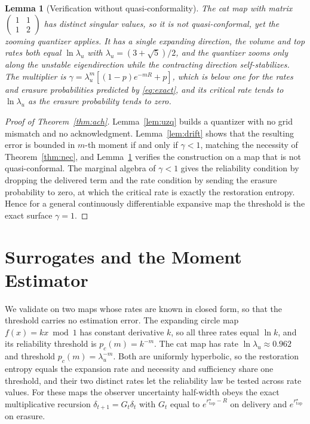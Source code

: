 \documentclass[journal]{IEEEtran}
\newtheorem{lemma}{Lemma}
\theoremstyle{definition}
\theoremstyle{remark}
\newcommand{\rtop}{r^\star_{\mathrm{top}}}
\begin{document}
\begin{lemma}[Verification without quasi-conformality]\label{lem:cat}
The cat map with matrix $\left(\begin{smallmatrix}1&1\\1&2\end{smallmatrix}\right)$ has distinct singular values,
so it is not quasi-conformal, yet the zooming quantizer applies. It has a single expanding direction, the volume
and top rates both equal $\ln\lambda_u$ with $\lambda_u=(3+\sqrt5)/2$, and the quantizer zooms only along the
unstable eigendirection while the contracting direction self-stabilizes. The multiplier is
$\gamma=\lambda_u^{m}[(1-p)e^{-mR}+p]$, which is below one for the rates and erasure probabilities predicted by
\eqref{eq:exact}, and its critical rate tends to $\ln\lambda_u$ as the erasure probability tends to zero.
\end{lemma}

\begin{proof}[Proof of Theorem~\ref{thm:ach}]
Lemma~\ref{lem:uzq} builds a quantizer with no grid mismatch and no acknowledgment. Lemma~\ref{lem:drift} shows
that the resulting error is bounded in $m$-th moment if and only if $\gamma<1$, matching the necessity of
Theorem~\ref{thm:nec}, and Lemma~\ref{lem:cat} verifies the construction on a map that is not quasi-conformal.
The marginal algebra of $\gamma<1$ gives the reliability condition by dropping the delivered term and the rate
condition by sending the erasure probability to zero, at which the critical rate is exactly the restoration
entropy. Hence for a general continuously differentiable expansive map the threshold is the exact surface
$\gamma=1$.
\end{proof}

\section{Surrogates and the Moment Estimator}\label{sec:surr}
We validate on two maps whose rates are known in closed form, so that the threshold carries no estimation error.
The expanding circle map $f(x)=kx\bmod 1$ has constant derivative $k$, so all three rates equal $\ln k$, and its
reliability threshold is $p_c(m)=k^{-m}$. The cat map has rate $\ln\lambda_u\approx0.962$ and threshold
$p_c(m)=\lambda_u^{-m}$. Both are uniformly hyperbolic, so the restoration entropy equals the expansion rate and
necessity and sufficiency share one threshold, and their two distinct rates let the reliability law be tested
across rate values. For these maps the observer uncertainty half-width obeys the exact multiplicative recursion
$\delta_{t+1}=G_t\delta_t$ with $G_t$ equal to $e^{\rtop-R}$ on delivery and $e^{\rtop}$ on erasure.
\end{document}
